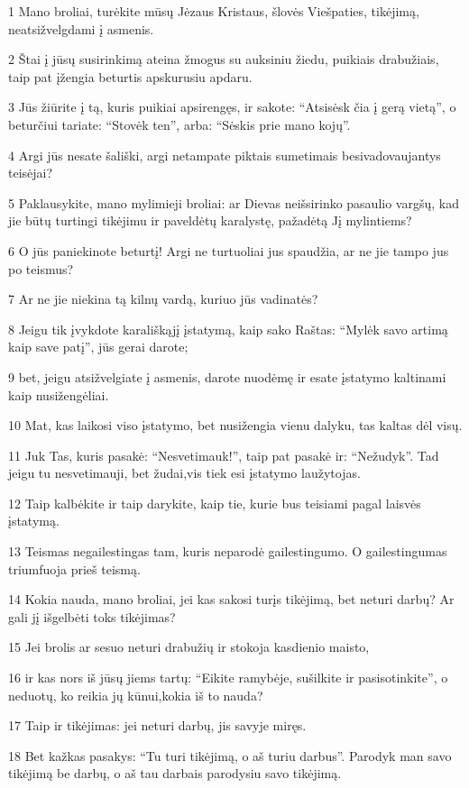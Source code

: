 \par 1 Mano broliai, turėkite mūsų Jėzaus Kristaus, šlovės Viešpaties, tikėjimą, neatsižvelgdami į asmenis. 
\par 2 Štai į jūsų susirinkimą ateina žmogus su auksiniu žiedu, puikiais drabužiais, taip pat įžengia beturtis apskurusiu apdaru. 
\par 3 Jūs žiūrite į tą, kuris puikiai apsirengęs, ir sakote: “Atsisėsk čia į gerą vietą”, o beturčiui tariate: “Stovėk ten”, arba: “Sėskis prie mano kojų”. 
\par 4 Argi jūs nesate šališki, argi netampate piktais sumetimais besivadovaujantys teisėjai? 
\par 5 Paklausykite, mano mylimieji broliai: ar Dievas neišsirinko pasaulio vargšų, kad jie būtų turtingi tikėjimu ir paveldėtų karalystę, pažadėtą Jį mylintiems? 
\par 6 O jūs paniekinote beturtį! Argi ne turtuoliai jus spaudžia, ar ne jie tampo jus po teismus? 
\par 7 Ar ne jie niekina tą kilnų vardą, kuriuo jūs vadinatės? 
\par 8 Jeigu tik įvykdote karališkąjį įstatymą, kaip sako Raštas: “Mylėk savo artimą kaip save patį”, jūs gerai darote; 
\par 9 bet, jeigu atsižvelgiate į asmenis, darote nuodėmę ir esate įstatymo kaltinami kaip nusižengėliai. 
\par 10 Mat, kas laikosi viso įstatymo, bet nusižengia vienu dalyku, tas kaltas dėl visų. 
\par 11 Juk Tas, kuris pasakė: “Nesvetimauk!”, taip pat pasakė ir: “Nežudyk”. Tad jeigu tu nesvetimauji, bet žudai,­vis tiek esi įstatymo laužytojas. 
\par 12 Taip kalbėkite ir taip darykite, kaip tie, kurie bus teisiami pagal laisvės įstatymą. 
\par 13 Teismas negailestingas tam, kuris neparodė gailestingumo. O gailestingumas triumfuoja prieš teismą. 
\par 14 Kokia nauda, mano broliai, jei kas sakosi turįs tikėjimą, bet neturi darbų? Ar gali jį išgelbėti toks tikėjimas? 
\par 15 Jei brolis ar sesuo neturi drabužių ir stokoja kasdienio maisto, 
\par 16 ir kas nors iš jūsų jiems tartų: “Eikite ramybėje, sušilkite ir pasisotinkite”, o neduotų, ko reikia jų kūnui,­kokia iš to nauda? 
\par 17 Taip ir tikėjimas: jei neturi darbų, jis savyje miręs. 
\par 18 Bet kažkas pasakys: “Tu turi tikėjimą, o aš turiu darbus”. Parodyk man savo tikėjimą be darbų, o aš tau darbais parodysiu savo tikėjimą. 
